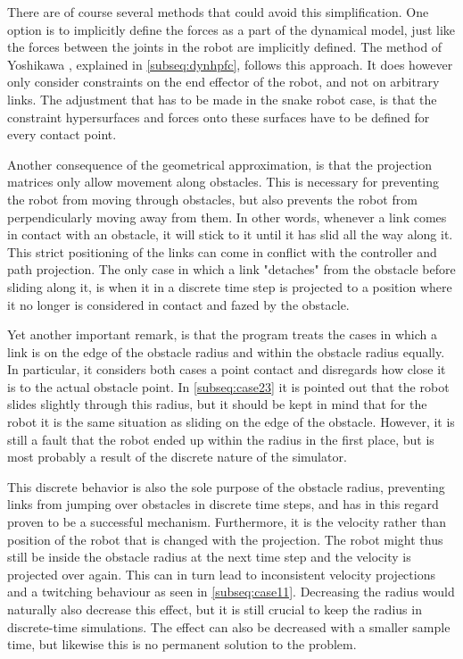 
There are of course several methods that could avoid this simplification.
One option is to implicitly define the forces as a part of the dynamical model, just like the forces between the joints in the robot are implicitly defined. The method of Yoshikawa \cite{yoshikawa1987dynamic}, explained in \ref{subseq:dynhpfc}, follows this approach. It does however only consider constraints on the end effector of the robot, and not on arbitrary links. The adjustment that has to be made in the snake robot case, is that the constraint hypersurfaces and forces onto these surfaces have to be defined for every contact point.


Another consequence of the geometrical approximation, is that the projection matrices only allow movement along obstacles. This is necessary for preventing the robot from moving through obstacles, but also prevents the robot from perpendicularly moving away from them. In other words, whenever a link comes in contact with an obstacle, it will stick to it until it has slid all the way along it. This strict positioning of the links can come in conflict with the controller and path projection. The only case in which a link "detaches" from the obstacle before sliding along it, is when it in a discrete time step is projected to a position where it no longer is considered in contact and fazed by the obstacle.

Yet another important remark, is that the program treats the cases in which a link is on the edge of the obstacle radius and within the obstacle radius equally. In particular, it considers both cases a point contact and disregards how close it is to the actual obstacle point. In \ref{subseq:case23} it is pointed out that the robot slides slightly through this radius, but it should be kept in mind that for the robot it is the same situation as sliding on the edge of the obstacle. However, it is still a fault that the robot ended up within the radius in the first place, but is most probably a result of the discrete nature of the simulator.

This discrete behavior is also the sole purpose of the obstacle radius, preventing links from jumping over obstacles in discrete time steps, and has in this regard proven to be a successful mechanism.
Furthermore, it is the velocity rather than position of the robot that is changed with the projection. The robot might thus still be inside the obstacle radius at the next time step and the velocity is projected over again. This can in turn lead to inconsistent velocity projections and a twitching behaviour as seen in \ref{subseq:case11}.
Decreasing the radius would naturally also decrease this effect, but it is still crucial to keep the radius in discrete-time simulations. The effect can also be decreased with a smaller sample time, but likewise this is no permanent solution to the problem.

